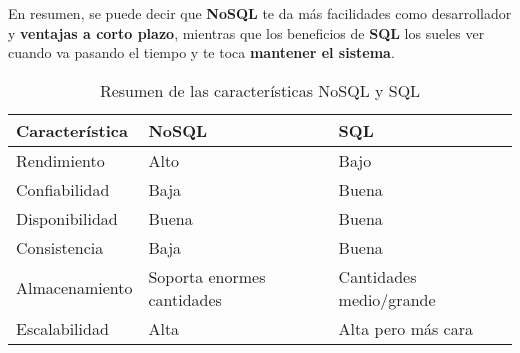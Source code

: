 En resumen, se puede decir que \textbf{NoSQL} te da más facilidades como desarrollador y \textbf{ventajas a corto plazo}, mientras que los beneficios de \textbf{SQL} los sueles ver cuando va pasando el tiempo y te toca \textbf{mantener el sistema}.

\vspace{1cm}

\begin{table}[H]
	\centering
	\begin{tabular}[c]{|l |l |l|}
		\hline
		\rowcolor{azulOscuro} \color{white}Característica & \color{white}NoSQL & \color{white}SQL \\
		\hline
		\cellcolor{azulClaro} Rendimiento & \cellcolor{verdeSuave}Alto & \cellcolor{rojoSuave}Bajo \\
		\cellcolor{azulClaro}Confiabilidad & \cellcolor{rojoSuave}Baja & \cellcolor{verdeSuave}Buena \\
		\cellcolor{azulClaro}Disponibilidad & \cellcolor{verdeSuave}Buena & \cellcolor{verdeSuave}Buena \\
		\cellcolor{azulClaro}Consistencia & \cellcolor{rojoSuave}Baja & \cellcolor{verdeSuave}Buena \\
		\cellcolor{azulClaro}Almacenamiento & \cellcolor{verdeSuave}Soporta enormes cantidades & \cellcolor{amarilloSuave}Cantidades medio/grande \\
		\cellcolor{azulClaro}Escalabilidad & \cellcolor{verdeSuave}Alta & \cellcolor{amarilloSuave}Alta pero más cara \\
		\hline
	
	\end{tabular}
	\caption{Resumen de las características NoSQL y SQL}
\end{table}


\newpage